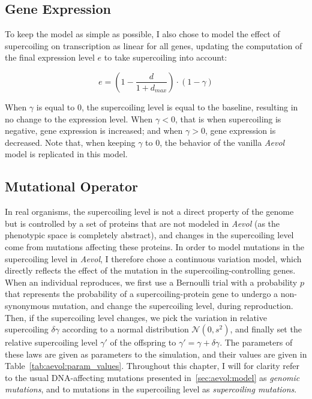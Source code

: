 \subsection{Gene Expression}
To keep the model as simple as possible, I also chose to model the effect of supercoiling on transcription as linear for all genes, updating the computation of the final expression level $e$ to take supercoiling into account:

\begin{equation}
e = (1 - \frac{d}{1+d_{max}}) \cdot (1 - \gamma)
\label{eq:aevol:sc}
\end{equation}

When $\gamma$ is equal to 0, the supercoiling level is equal to the baseline, resulting in no change to the expression level.
When $\gamma < 0$, that is when supercoiling is negative, gene expression is increased; and when $\gamma > 0$, gene expression is decreased.
Note that, when keeping $\gamma$ to 0, the behavior of the vanilla \emph{Aevol} model is replicated in this model.

\subsection{Mutational Operator}
In real organisms, the supercoiling level is not a direct property of the genome but is controlled by a set of proteins that are not modeled in \emph{Aevol} (as the phenotypic space is completely abstract), and changes in the supercoiling level come from mutations affecting these proteins.
In order to model mutations in the supercoiling level in \emph{Aevol}, I therefore chose a continuous variation model, which directly reflects the effect of the mutation in the supercoiling-controlling genes.
When an individual reproduces, we first use a Bernoulli trial with a probability $p$ that represents the probability of a supercoiling-protein gene to undergo a non-synonymous mutation, and change the supercoiling level, during reproduction.
Then, if the supercoiling level changes, we pick the variation in relative supercoiling $\delta\gamma$ according to a normal distribution $\mathcal{N}(0, s^2)$, and finally set the relative supercoiling level $\gamma'$ of the offspring to $\gamma' = \gamma + \delta\gamma$.
The parameters of these laws are given as parameters to the simulation, and their values are given in Table~\ref{tab:aevol:param_values}.
Throughout this chapter, I will for clarity refer to the usual DNA-affecting mutations presented in~\ref{sec:aevol:model} as \emph{genomic mutations}, and to mutations in the supercoiling level as \emph{supercoiling mutations}.


